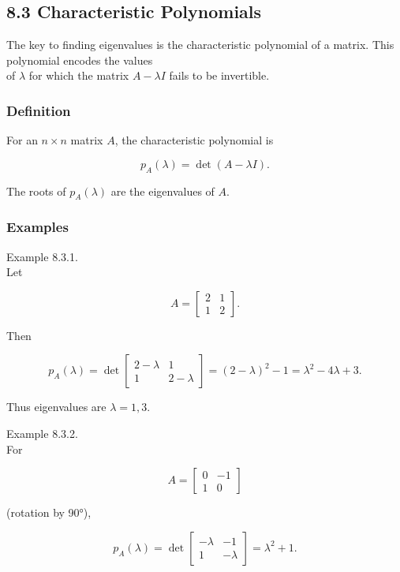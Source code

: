 \documentclass[
  12pt,
  a4paper,
]{article}
\begin{document}
\subsection{8.3 Characteristic
Polynomials}\label{83-characteristic-polynomials}

The key to finding eigenvalues is the characteristic polynomial of a
matrix. This polynomial encodes the values\\
of \(\lambda\) for which the matrix \(A - \lambda I\) fails to be
invertible.

\subsubsection{Definition}\label{definition-7}

For an \(n \times n\) matrix \(A\), the characteristic polynomial is

\[p_A(\lambda) = \det(A - \lambda I).\]

The roots of \(p_A(\lambda)\) are the eigenvalues of \(A\).

\subsubsection{Examples}\label{examples-8}

Example 8.3.1.\\
Let

\[A = \begin{bmatrix} 2 & 1 \\ 1 & 2 \end{bmatrix}.\]

Then

\[p_A(\lambda) = \det\!\begin{bmatrix} 2-\lambda & 1 \\ 1 & 2-\lambda \end{bmatrix}
= (2-\lambda)^2 - 1 = \lambda^2 - 4\lambda + 3.\]

Thus eigenvalues are \(\lambda = 1, 3\).

Example 8.3.2.\\
For

\[A = \begin{bmatrix} 0 & -1 \\ 1 & 0 \end{bmatrix}\]

(rotation by 90°),

\[p_A(\lambda) = \det\!\begin{bmatrix} -\lambda & -1 \\ 1 & -\lambda \end{bmatrix}
= \lambda^2 + 1.\]
\end{document}
